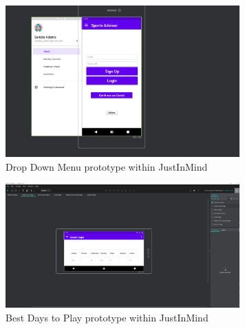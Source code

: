\begin{figure}[H]
    \centering
    \includegraphics[width=9cm]{img/dropDownMenu.PNG}
    \caption{Drop Down Menu prototype within JustInMind}
    \label{fig:altas config}
\end{figure}

\begin{figure}[H]
    \centering
    \includegraphics[width=9cm]{img/BestDays.PNG}
    \caption{Best Days to Play prototype within JustInMind}
    \label{fig:altas config}
\end{figure}

